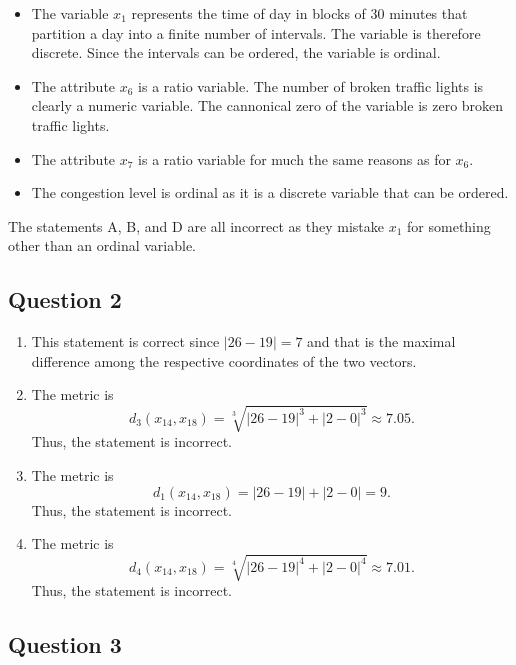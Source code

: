 \documentclass[twoside,11pt]{article}
\begin{document}
\begin{itemize}
\item
  The variable \(x_1\) represents the time of day in blocks of 30
  minutes that partition a day into a finite number of intervals. The
  variable is therefore discrete. Since the intervals can be ordered,
  the variable is ordinal.
\item
  The attribute \(x_6\) is a ratio variable. The number of broken
  traffic lights is clearly a numeric variable. The cannonical zero of
  the variable is zero broken traffic lights.
\item
  The attribute \(x_7\) is a ratio variable for much the same reasons as
  for \(x_6\).
\item
  The congestion level is ordinal as it is a discrete variable that can
  be ordered.
\end{itemize}

The statements A, B, and D are all incorrect as they mistake \(x_1\) for something other than an ordinal variable.

\subsection*{Question 2}

\begin{enumerate}[label=\Alph*.]
	\item This statement is correct since \(|26 - 19| = 7\) and that is the maximal difference among the respective coordinates of the two vectors.

	\item The metric is
	\[
		d_3(x_{14}, x_{18}) = \sqrt[3]{|26 - 19|^3 + |2 - 0|^3} \approx 7.05.
	\]
	Thus, the statement is incorrect.

	\item The metric is
	\[
		d_1(x_{14}, x_{18}) = |26 - 19| + |2 - 0| = 9.
	\]
	Thus, the statement is incorrect.

	\item The metric is
	\[
		d_4(x_{14}, x_{18}) = \sqrt[4]{|26 - 19|^4 + |2 - 0|^4} \approx 7.01.
	\]
	Thus, the statement is incorrect.

\end{enumerate}

\subsection*{Question 3}
\end{document}
